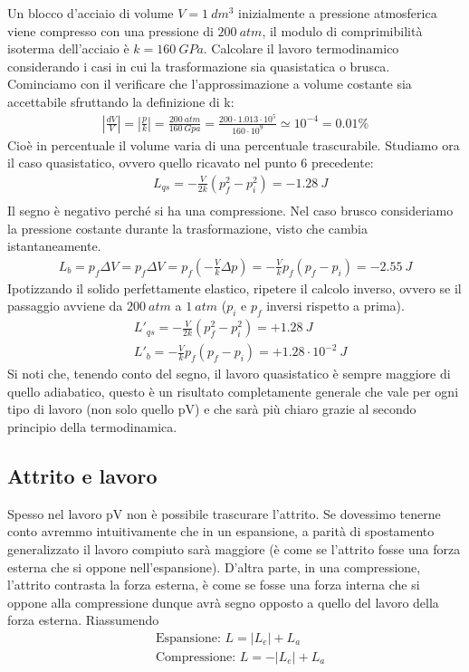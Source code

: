 \documentclass[
10pt, %
a4paper, %
oneside, %
headinclude,footinclude, %
BCOR5mm, %
]{scrartcl}
\begin{document}
\begin{exercise}
	Un blocco d'acciaio di volume $V = 1\ dm^3$ inizialmente a pressione atmosferica viene compresso con una pressione di $200\ atm$, il modulo di comprimibilità isoterma dell'acciaio è $k = 160\ GPa$. Calcolare il lavoro termodinamico considerando i casi in cui la trasformazione sia quasistatica o brusca.\\
	Cominciamo con il verificare che l'approssimazione a volume costante sia accettabile sfruttando la definizione di k:
	\begin{align*} 
		|\frac{dV}{V}|=|\frac{p}{k}|=\frac{200\ atm}{160\ Gpa}=\frac{200\cdot 1.013\cdot 10^5}{160\cdot 10^9} \simeq 10^{-4} = 0.01 \%
	\end{align*} 
	Cioè in percentuale il volume varia di una percentuale trascurabile. Studiamo ora il caso quasistatico, ovvero quello ricavato nel punto 6 precedente:
	\begin{align*} 
		&L_{qs} = -\frac{V}{2k}\left(p_f^2-p_i^2\right) = -1.28\ J\\	
	\end{align*} 
	Il segno è negativo perché si ha una compressione. Nel caso brusco consideriamo la pressione costante durante la trasformazione, visto che cambia istantaneamente.
	\begin{align*} 
		L_b = p_f\Delta V = p_f\Delta V = p_f\left(-\frac{V}{k}\Delta p \right)=-\frac{V}{k} p_f(p_f - p_i) = -2.55\ J
	\end{align*} 
	Ipotizzando il solido perfettamente elastico, ripetere il calcolo inverso, ovvero se il passaggio avviene da $200\ atm$ a $1\ atm$ ($p_i$ e $p_f$ inversi rispetto a prima).
	\begin{align*} 
		&L'_{qs} = -\frac{V}{2k}\left(p_f^2-p_i^2\right) = +1.28\ J\\
		&L'_b = -\frac{V}{k} p_f(p_f - p_i) = +1.28 \cdot 10^{-2}\ J
	\end{align*} 
	Si noti che, tenendo conto del segno, il lavoro quasistatico è sempre maggiore di quello adiabatico, questo è un risultato completamente generale che vale per ogni tipo di lavoro (non solo quello pV) e che sarà più chiaro grazie al secondo principio della termodinamica.
\end{exercise}
\subsection{Attrito e lavoro}
Spesso nel lavoro pV non è possibile trascurare l'attrito. Se dovessimo tenerne conto avremmo intuitivamente che in un espansione, a parità di spostamento generalizzato il lavoro compiuto sarà maggiore (è come se l'attrito fosse una forza esterna che si oppone nell'espansione). D'altra parte, in una compressione, l'attrito contrasta la forza esterna, è come se fosse una forza interna che si oppone alla compressione dunque avrà segno opposto a quello del lavoro della forza esterna. Riassumendo
\begin{align*} 
	&\text{Espansione: } L = |L_e| + L_a\\
	&\text{Compressione: } L = -|L_e| +L_a
\end{align*} 
\end{document}
